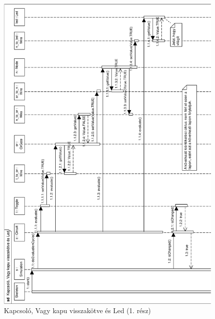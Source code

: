 \begin{figure}[H]
\begin{center}
\includegraphics[width=16cm]{chapters/chapter05/imgs/test5-1.pdf}
\caption{Kapcsoló, Vagy kapu visszakötve és Led (1. rész)}
\label{fig:init}
\end{center}
\end{figure}

